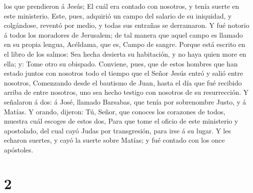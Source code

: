 los que prendieron á Jesús;  El cuál era contado con
nosotros, y tenía suerte en este ministerio.  Este, pues,
adquirió un campo del salario de su iniquidad, y colgándose, reventó por
medio, y todas sus entrañas se derramaron.  Y fué notorio á
todos los moradores de Jerusalem; de tal manera que aquel campo es
llamado en su propia lengua, Acéldama, que es, Campo de sangre.
 Porque está escrito en el libro de los salmos: Sea hecha
desierta su habitación, y no haya quien more en ella; y: Tome otro su
obispado.  Conviene, pues, que de estos hombres que han
estado juntos con nosotros todo el tiempo que el Señor Jesús entró y
salió entre nosotros,  Comenzando desde el bautismo de
Juan, hasta el día que fué recibido arriba de entre nosotros, uno sea
hecho testigo con nosotros de su resurrección.  Y señalaron
á dos: á José, llamado Barsabas, que tenía por sobrenombre Justo, y á
Matías.  Y orando, dijeron: Tú, Señor, que conoces los
corazones de todos, muestra cuál escoges de estos dos, 
Para que tome el oficio de este ministerio y apostolado, del cual cayó
Judas por transgresión, para irse á su lugar.  Y les
echaron suertes, y cayó la suerte sobre Matías; y fué contado con los
once apóstoles.

\hypertarget{section-1}{%
\section{2}\label{section-1}}

